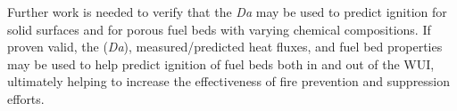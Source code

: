     Further work is needed to verify that the \textit{Da} may be used to predict ignition for solid surfaces and for porous fuel beds with varying chemical compositions.  If proven valid, the (\textit{Da}), measured/predicted heat fluxes, and fuel bed properties may be used to help predict ignition of fuel beds both in and out of the WUI, ultimately helping to increase the effectiveness of fire prevention and suppression efforts.
